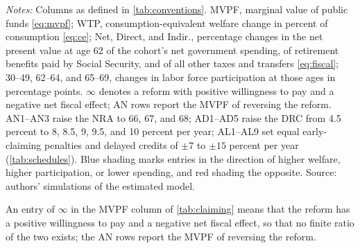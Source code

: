 \begin{table}[!t]
\centering
\caption{Claiming-Schedule Reforms: Marginal Value of Public Funds, Willingness to Pay, Fiscal Effects, and Participation}
\label{tab:claiming}
\vspace{6pt}
\footnotesize
\begin{threeparttable}

\begin{tablenotes}[flushleft]\scriptsize
\item[] \textit{Notes:} Columns as defined in \autoref{tab:conventions}. MVPF, marginal value of public funds \eqref{eq:mvpf}; WTP, consumption-equivalent welfare change in percent of consumption \eqref{eq:ce}; Net, Direct, and Indir., percentage changes in the net present value at age 62 of the cohort's net government spending, of retirement benefits paid by Social Security, and of all other taxes and transfers \eqref{eq:fiscal}; 30--49, 62--64, and 65--69, changes in labor force participation at those ages in percentage points. $\infty$ denotes a reform with positive willingness to pay and a negative net fiscal effect; AN rows report the MVPF of reversing the reform. AN1--AN3 raise the NRA to 66, 67, and 68; AD1--AD5 raise the DRC from 4.5 percent to 8, 8.5, 9, 9.5, and 10 percent per year; AL1--AL9 set equal early-claiming penalties and delayed credits of $\pm 7$ to $\pm 15$ percent per year (\autoref{tab:schedules}). Blue shading marks entries in the direction of higher welfare, higher participation, or lower spending, and red shading the opposite. Source: authors' simulations of the estimated model.
\end{tablenotes}
\end{threeparttable}
\end{table}

An entry of $\infty$ in the MVPF column of \autoref{tab:claiming} means that the reform has a positive willingness to pay and a negative net fiscal effect, so that no finite ratio of the two exists; the AN rows report the MVPF of reversing the reform. %

